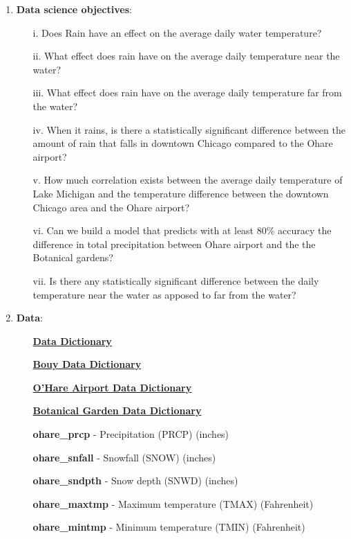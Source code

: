 \documentclass[10pt]{article}
\begin{document}
\begin{enumerate}[\null]

\item \textbf{Data science objectives}:
\begin{enumerate}
\item[i.] Does Rain have an effect on the average daily water temperature?
\item[ii.] What effect does rain have on the average daily temperature near the water?
\item[iii.] What effect does rain have on the average daily temperature far from the water?
\item[iv.] When it rains, is there a statistically significant difference between the amount of rain that falls in downtown Chicago compared to the Ohare airport?
\item[v.] How much correlation exists between the average daily temperature of Lake Michigan and the temperature difference between the downtown Chicago area and the Ohare airport?
\item[vi.] Can we build a model that predicts with at least 80\% accuracy the difference in total precipitation between Ohare airport and the the Botanical gardens?
\item[vii.] Is there any statistically significant difference between the daily temperature near the water as apposed to far from the water?
\end{enumerate}
 


\item \textbf{Data}: 

\begin{enumerate}
\item[] \href{http://localhost:8888/notebooks/Projects/Repos_BlakeWallace/Capstone/working/EDA_and_analysis.ipynb#Data-Dictionary}\textbf{Data Dictionary}
\item[] \href{https://www.ndbc.noaa.gov/measdes.shtml} \textbf{Bouy Data Dictionary}
\item[] \href{https://www1.ncdc.noaa.gov/pub/data/ghcn/daily/readme.txt} \textbf{O'Hare Airport Data Dictionary}
\item[] \href{https://www1.ncdc.noaa.gov/pub/data/ghcn/daily/readme.txt} \textbf{Botanical Garden Data Dictionary}

\end{enumerate}

\begin{enumerate}
 \item[] \textbf{ohare\_prcp} - Precipitation (PRCP) (inches)
 \item[] \textbf{ohare\_snfall} - Snowfall (SNOW) (inches)
 \item[] \textbf{ohare\_sndpth} - Snow depth (SNWD) (inches) 
 \item[] \textbf{ohare\_maxtmp} - Maximum temperature (TMAX) (Fahrenheit)
 \item[] \textbf{ohare\_mintmp} - Minimum temperature (TMIN) (Fahrenheit)
\end{enumerate}


\end{enumerate}
\end{document}
